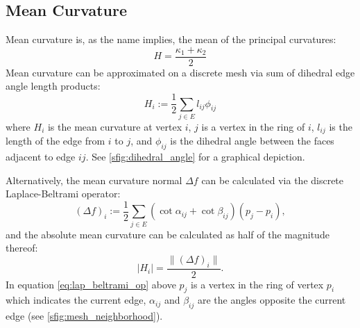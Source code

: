 \subsection{Mean Curvature}\label{sec:mean_k}
Mean curvature is, as the name implies, the mean of the principal curvatures\cite{DDGAppIntro_19_discrete_k_2}:
\begin{equation}\label{eq:mean_k}
	H = \frac{\kappa_1 + \kappa_2}{2}
\end{equation}
Mean curvature can be approximated on a discrete mesh via sum of dihedral edge angle length products:
\begin{equation}\label{eq:dihedral_angle}
	H_i := \frac{1}{2}\sum_{j \in E}l_{ij} \phi_{ij}
\end{equation}
where $H_i$ is the mean curvature at vertex $i$, $j$ is a vertex in the ring of $i$, $l_{ij}$ is the length of the edge from $i$ to $j$, and $\phi_{ij}$ is the dihedral angle between the faces adjacent to edge $ij$.
See \ref{sfig:dihedral_angle} for a graphical depiction.

Alternatively, the mean curvature normal $\Delta f$ can be calculated via the discrete Laplace-Beltrami operator\cite{DDGAppIntro_18_discrete_k_1}:
\begin{equation}\label{eq:lap_beltrami_op}
	(\Delta f)_i := \frac{1}{2}\sum_{j \in E}(\cot \alpha_{ij} + \cot \beta_{ij})(p_j - p_i),
\end{equation}
and the absolute mean curvature can be calculated as half of the magnitude thereof:
\begin{equation}
	|H_i| = \frac{\|(\Delta f)_i \|}{2}.
\end{equation}
In equation \ref{eq:lap_beltrami_op} above $p_j$ is a vertex in the ring of vertex $p_i$ which indicates the current edge, $\alpha_{ij}$ and $\beta_{ij}$ are the angles opposite the current edge (see \ref{sfig:mesh_neighborhood}).

